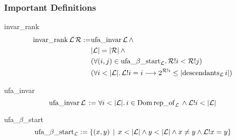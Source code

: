 \begin{frame}
	\frametitle{Important Definitions}
	\vspace{1cm}
	\begin{definition}{invar\_rank}
		\begin{align}
		\mathrm{invar\_rank}\, \mathcal{L} \, \mathcal{R} := 
		&\mathrm{ufa\_invar} \, \mathcal{L} \, \land \\
		&|\mathcal{L}| = |\mathcal{R}| \, \land \\
		&(\forall (i,j) \in \mathrm{ufa\_}\beta\mathrm{\_start}_\mathcal{L}. \, \mathcal{R}!i < \mathcal{R}!j) \\
		&(\forall i < |\mathcal{L}|.\, \mathcal{L}!i = i \longrightarrow 2^{\mathcal{R}!i} \leq |\mathrm{descendants}_{\mathcal{L}} \, i|)
		\end{align}
	\end{definition}
	\begin{definition}{ufa\_invar}
	\begin{equation}
	\mathrm{ufa\_invar} \, \mathcal{L} \, := \forall i < |\mathcal{L}|.\, i \in \mathrm{Dom}\, \mathrm{rep\_of}_\mathcal{L}\, \land \mathcal{L}!i < |\mathcal{L}|
	\end{equation}
	\end{definition}

\begin{definition}{ufa\_$\beta$\_start}
\begin{equation}
\ufabstart := \{(x,y) \,\mid\, x<|\LL| \land y<|\LL| \land x \neq y \land \LL!x = y \}
\end{equation}
\end{definition}

\end{frame}



